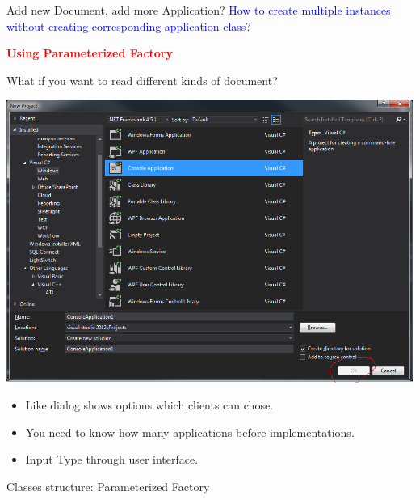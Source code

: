 \documentclass[13pt]{beamer}
\begin{document}
\begin{frame}{Add new Document, add more Application?}
	\textcolor{blue}{How to create multiple instances without creating corresponding application class?}	
	\begin{center}
	\textcolor{red}{\textbf{Using Parameterized Factory}}
	\end{center}
\end{frame}

\begin{frame}{What if you want to read different kinds of document?}
\begin{center}
\includegraphics[scale=0.25]{./images/visualDialog.png}
\end{center}

\begin{itemize}
	\setlength\itemsep{1em}
	\item Like dialog shows options which clients can chose.
	\item You need to know how many applications before implementations.
	\item Input Type through user interface.
\end{itemize}
\end{frame}

\begin{frame}{Classes structure: Parameterized Factory}
\begin{center}
\end{center}
\end{frame}
\end{document}
